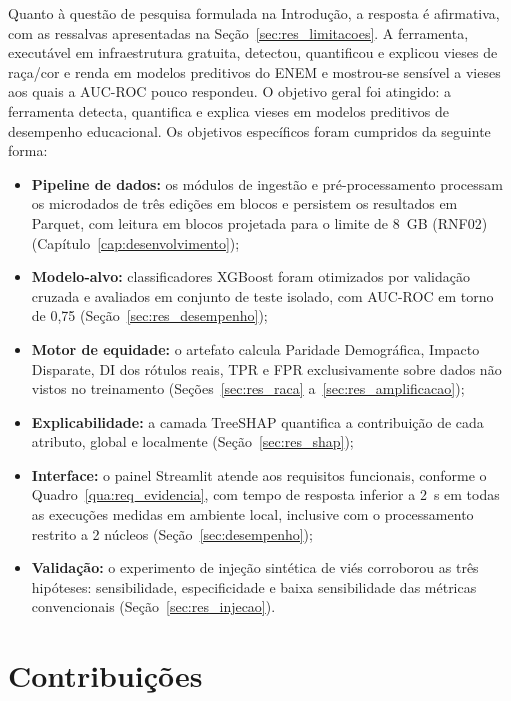 Quanto à questão de pesquisa formulada na Introdução, a resposta é afirmativa, com as ressalvas apresentadas na Seção~\ref{sec:res_limitacoes}. A ferramenta, executável em infraestrutura gratuita, detectou, quantificou e explicou vieses de raça/cor e renda em modelos preditivos do ENEM e mostrou-se sensível a vieses aos quais a AUC-ROC pouco respondeu. O objetivo geral foi atingido: a ferramenta detecta, quantifica e explica vieses em modelos preditivos de desempenho educacional. Os objetivos específicos foram cumpridos da seguinte forma:
\begin{itemize}
    \item \textbf{Pipeline de dados:} os módulos de ingestão e pré-processamento processam os microdados de três edições em blocos e persistem os resultados em Parquet, com leitura em blocos projetada para o limite de 8~GB (RNF02) (Capítulo~\ref{cap:desenvolvimento});
    \item \textbf{Modelo-alvo:} classificadores XGBoost foram otimizados por validação cruzada e avaliados em conjunto de teste isolado, com AUC-ROC em torno de 0,75 (Seção~\ref{sec:res_desempenho});
    \item \textbf{Motor de equidade:} o artefato calcula Paridade Demográfica, Impacto Disparate, DI dos rótulos reais, TPR e FPR exclusivamente sobre dados não vistos no treinamento (Seções~\ref{sec:res_raca} a~\ref{sec:res_amplificacao});
    \item \textbf{Explicabilidade:} a camada TreeSHAP quantifica a contribuição de cada atributo, global e localmente (Seção~\ref{sec:res_shap});
    \item \textbf{Interface:} o painel Streamlit atende aos requisitos funcionais, conforme o Quadro~\ref{qua:req_evidencia}, com tempo de resposta inferior a 2~s em todas as execuções medidas em ambiente local, inclusive com o processamento restrito a 2 núcleos (Seção~\ref{sec:desempenho});
    \item \textbf{Validação:} o experimento de injeção sintética de viés corroborou as três hipóteses: sensibilidade, especificidade e baixa sensibilidade das métricas convencionais (Seção~\ref{sec:res_injecao}).
\end{itemize}

\section{Contribuições}

